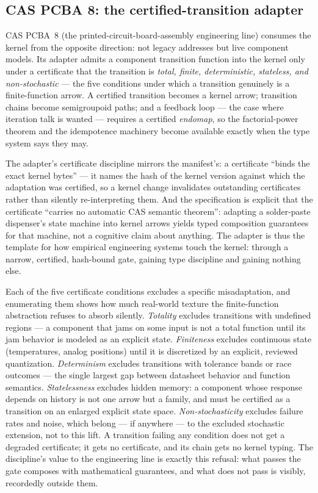\subsection{CAS PCBA 8: the certified-transition adapter}\label{ch12:sec:pcba8}

CAS PCBA~8 (the printed-circuit-board-assembly engineering line)
consumes the kernel from the opposite direction: not legacy addresses
but live component models. Its adapter admits a component transition
function into the kernel only under a certificate that the transition
is \emph{total, finite, deterministic, stateless, and non-stochastic}
--- the five conditions under which a transition genuinely is a
finite-function arrow. A certified transition becomes a kernel arrow;
transition chains become semigroupoid paths; and a feedback loop ---
the case where iteration talk is wanted --- requires a certified
\emph{endomap}, so the factorial-power theorem and the idempotence
machinery become available exactly when the type system says they may.

The adapter's certificate discipline mirrors the manifest's: a
certificate ``binds the exact kernel bytes'' --- it names the hash of
the kernel version against which the adaptation was certified, so a
kernel change invalidates outstanding certificates rather than silently
re-interpreting them. And the specification is explicit that the
certificate ``carries no automatic CAS semantic theorem'': adapting a
solder-paste dispenser's state machine into kernel arrows yields typed
composition guarantees for that machine, not a cognitive claim about
anything. The adapter is thus the template for how empirical
engineering systems touch the kernel: through a narrow, certified,
hash-bound gate, gaining type discipline and gaining nothing else.

Each of the five certificate conditions excludes a specific
misadaptation, and enumerating them shows how much real-world texture
the finite-function abstraction refuses to absorb silently.
\emph{Totality} excludes transitions with undefined regions --- a
component that jams on some input is not a total function until its
jam behavior is modeled as an explicit state. \emph{Finiteness}
excludes continuous state (temperatures, analog positions) until it
is discretized by an explicit, reviewed quantization.
\emph{Determinism} excludes transitions with tolerance bands or race
outcomes --- the single largest gap between datasheet behavior and
function semantics. \emph{Statelessness} excludes hidden memory: a
component whose response depends on history is not one arrow but a
family, and must be certified as a transition on an enlarged explicit
state space. \emph{Non-stochasticity} excludes failure rates and
noise, which belong --- if anywhere --- to the excluded stochastic
extension, not to this lift. A transition failing any condition does
not get a degraded certificate; it gets no certificate, and its chain
gets no kernel typing. The discipline's value to the engineering line
is exactly this refusal: what passes the gate composes with
mathematical guarantees, and what does not pass is visibly,
recordedly outside them.

